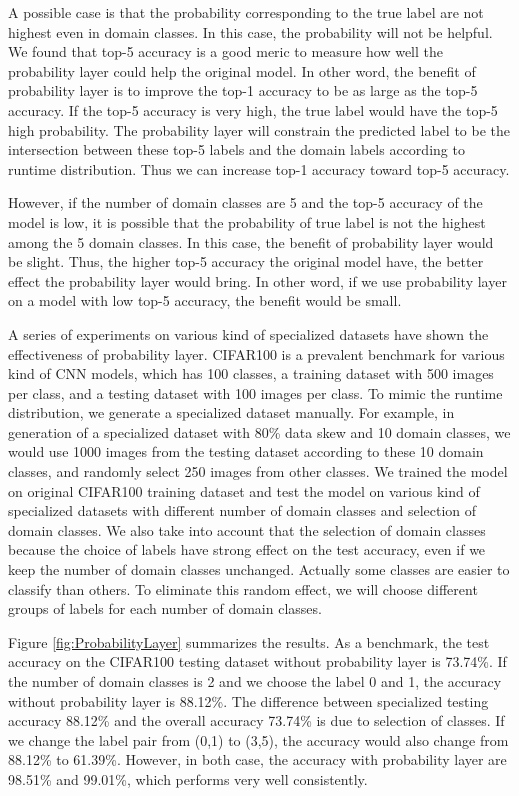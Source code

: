 \documentclass{article}
\begin{document}
A possible case is that the probability corresponding to the true label are not highest even in domain classes. In this case, the probability will not be helpful. We found that top-5 accuracy is a good meric to measure how well the probability layer could help the original model. In other word, the benefit of probability layer is to improve the top-1 accuracy to be as large as the top-5 accuracy. If the top-5 accuracy is very high, the true label would have the top-5 high probability. The probability layer will constrain the predicted label to be the intersection between these top-5 labels and the domain labels according to runtime distribution. Thus we can increase top-1 accuracy toward top-5 accuracy. 

However, if the number of domain classes are 5 and the top-5 accuracy of the model is low, it is possible that the probability of true label is not the highest among the 5 domain classes. In this case, the benefit of probability layer would be slight. Thus, the higher top-5 accuracy the original model have, the better effect the probability layer would bring. In other word, if we use probability layer on a model with low top-5 accuracy, the benefit would be small. 

A series of experiments on various kind of specialized datasets have shown the effectiveness of probability layer. CIFAR100 is a prevalent benchmark for various kind of CNN models, which has 100 classes, a training dataset with 500 images per class, and a testing dataset with 100 images per class. To mimic the runtime distribution, we generate a specialized dataset manually. For example, in generation of a specialized dataset with 80\% data skew and 10 domain classes, we would use 1000 images from the testing dataset according to these 10 domain classes, and randomly select 250 images from other classes. We trained the model on original CIFAR100 training dataset and test the model on various kind of specialized datasets with different number of domain classes and selection of domain classes. We also take into account that the selection of domain classes because the choice of labels have strong effect on the test accuracy, even if we keep the number of domain classes unchanged. Actually some classes are easier to classify than others. To eliminate this random effect, we will choose different groups of labels for each number of domain classes.

Figure \ref{fig:ProbabilityLayer} summarizes the results. As a benchmark, the test accuracy on the CIFAR100 testing dataset without probability layer is 73.74\%. If the number of domain classes is 2 and we choose the label 0 and 1, the accuracy without probability layer is 88.12\%. The difference between specialized testing accuracy 88.12\% and the overall accuracy 73.74\% is due to selection of classes. If we change the label pair from (0,1) to (3,5), the accuracy would also change from 88.12\% to 61.39\%. However, in both case, the accuracy with probability layer are 98.51\% and 99.01\%, which performs very well consistently. 
\end{document}
